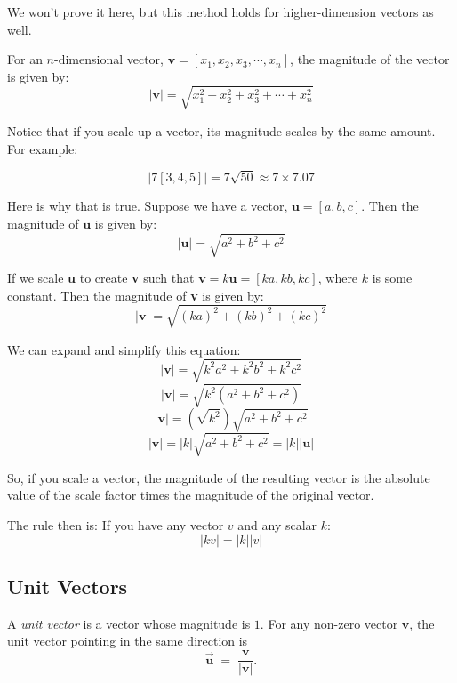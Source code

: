 We won't prove it here, but this method holds for higher-dimension vectors as well. 

\begin{mdframed}[style = important, frametitle = {Magnitude of Vectors}]
For an $n$-dimensional vector, $\textbf{v} = \left[ x_1, x_2, x_3, \cdots, x_n 
\right]$, the magnitude of the vector is given by:
$$\left| \textbf{v} \right| = \sqrt{x_1^2 + x_2^2 + x_3^2 + \cdots + x_n^2}$$
\end{mdframed}

Notice that if you scale up a vector, its magnitude scales by the same amount. 
For example:

\begin{equation*}
|7[3,4,5]| = 7 \sqrt{50} \approx 7 \times 7.07    
\end{equation*}

Here is why that is true. Suppose we have a vector, $\textbf{u} = \left[a, b, 
c \right]$. Then the magnitude of $\textbf{u}$ is given by:
$$\left| \textbf{u} \right| = \sqrt{a^2 + b^2 + c^2}$$

If we scale \textbf{u} to create \textbf{v} such that $\textbf{v} = k 
\textbf{u} = \left[ ka, kb, kc \right]$, where $k$ is some constant. Then the 
magnitude of \textbf{v} is given by:
$$\left| \textbf{v} \right| = \sqrt{\left( ka \right)^2 + \left( kb \right)^2 
+ \left( kc \right)^2}$$

We can expand and simplify this equation:
$$\left| \textbf{v} \right| = \sqrt{k^2 a^2 + k^2 b^2 + k^2 c^2}$$
$$\left| \textbf{v} \right| = \sqrt{k^2 \left( a^2 + b^2 + c^2 \right)}$$
$$\left| \textbf{v} \right| = \left( \sqrt{k^2} \right) \sqrt{a^2 + b^2 + 
c^2}$$
$$\left| \textbf{v} \right| = \left| k \right| \sqrt{a^2 + b^2 + c^2} = 
\left| k \right| \left| \textbf{u} \right|$$

So, if you scale a vector, the magnitude of the resulting vector is the absolute value of the scale factor times the magnitude of the original vector. 

The rule then is: If you have any vector $v$ and any scalar $k$:
\begin{equation*}
    |k v| = |k| |v|
\end{equation*}

\subsection{Unit Vectors}

A \emph{unit vector} is a vector whose magnitude is \(1\).
For any non-zero vector \(\mathbf v\), the unit vector pointing in the
same direction is
\[
\vec{\mathbf u}\;=\;\frac{\mathbf v}{\lvert \mathbf v\rvert}.
\]

